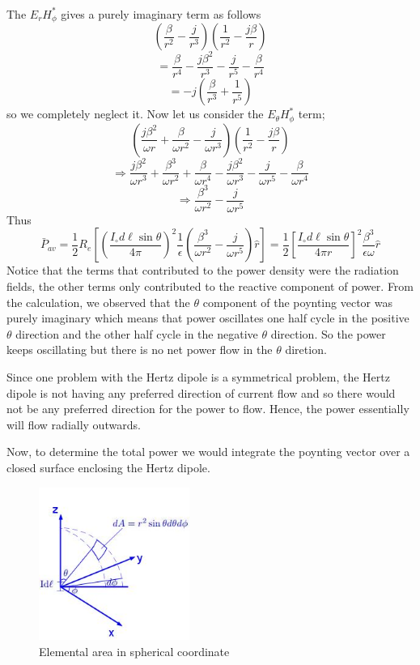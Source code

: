 \paragraph{}
The $E_rH_\phi^*$ gives a purely imaginary term as follows
$$\left(\dfrac{\beta}{r^2} - \dfrac{j}{r^3}\right)\left(\dfrac{1}{r^2} 
 - \dfrac{j\beta}{r}\right)$$
$$=  \dfrac{\beta}{r^4} - \dfrac{j\beta^2}{r^3} 
- \dfrac{j}{r^5} - \dfrac{\beta}{r^4} $$
$$= -j\left( \dfrac{\beta}{r^3}  +  \dfrac{1}{r^5}\right) $$
so we completely neglect it. Now let us consider the $E_\theta H_\phi^*$ term;
$$\left(\dfrac{j\beta^2}{\omega r} + \dfrac{\beta}{\omega r^2} - \dfrac{j}{\omega r^3}\right)\left(\dfrac{1}{r^2} - \dfrac{j\beta}{r}\right)$$
$$\Longrightarrow \dfrac{j\beta^2}{\omega r^3} 
+ \dfrac{\beta^3}{\omega r^2} + \dfrac{\beta}{\omega r^4} 
- \dfrac{j\beta^2}{\omega r^3} - \dfrac{j}{\omega r^5}
- \dfrac{\beta}{\omega r^4}$$
$$\Longrightarrow \dfrac{\beta^3}{\omega r^2} - \dfrac{j}{\omega r^5}$$
Thus \quad  
\begin{dmath*}
\bar{P}_{av} = \dfrac{1}{2}\mathit{R_e}\left[\left(\dfrac{I_\circ d\ell\sin\theta}{4\pi}\right)^2\dfrac{1}{\epsilon} \left(\dfrac{\beta^3}{\omega r^2} - \dfrac{j}{\omega r^5}\right)\hat{r}\right]
= \dfrac{1}{2}
\left[\dfrac{I_\circ d\ell\sin\theta}{4\pi r}\right]^2 \dfrac{\beta^3}{\epsilon\omega}\hat{r} 
\end{dmath*}
Notice that the terms that contributed to the power density were the radiation fields, the other terms only contributed to the reactive component of power. From the calculation, we observed that the $\theta$  component of the poynting vector was purely imaginary which means that power oscillates one half cycle in the positive $\theta$ direction and the other half cycle in the negative $\theta$ direction. So the power keeps oscillating but there is no net power flow in the $\theta$ diretion.

Since one problem with the Hertz dipole is a symmetrical problem, the Hertz dipole is not having any preferred direction of current flow and so there would not be any preferred direction for the power to flow. Hence, the power essentially will flow radially outwards.

Now, to determine the total power we would integrate the poynting vector over a closed surface enclosing the Hertz dipole.
\begin{figure}[h]
\centering
\includegraphics[height=5cm]{./graphics/diagram1}
\caption{Elemental area in spherical coordinate}
\label{figure12}
\end{figure}

